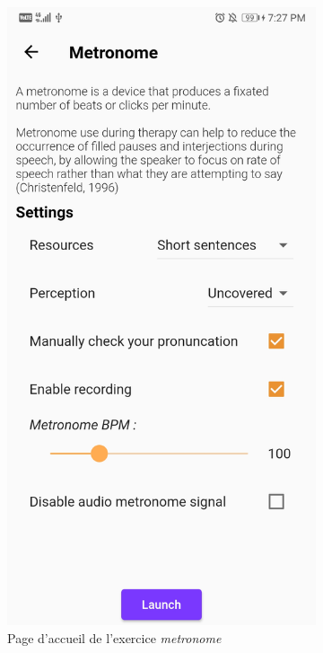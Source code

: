 \begin{appendices}
\begin{landscape}
\begin{figure}[h]
\begin{subfigure}{.25\textwidth}
    \includegraphics[width=.75\linewidth]{content/imgs/screen3.jpg}
    \caption{Page d'accueil de l'exercice \textit{metronome}}
  \end{subfigure}%
  \begin{subfigure}{.25\textwidth}
    \centering

\end{subfigure}
\end{figure}
\end{landscape}
\end{appendices}
